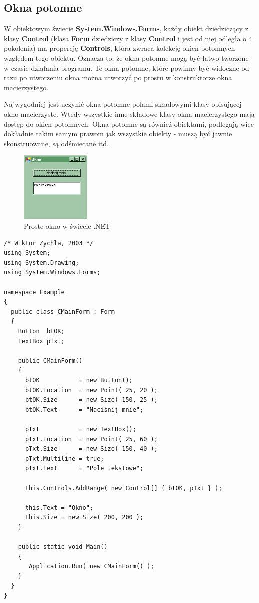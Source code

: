 \subsection{Okna potomne}

W obiektowym świecie {\bf System.Windows.Forms}, każdy obiekt dziedziczący z klasy {\bf Control} (klasa
{\bf Form} dziedziczy z klasy {\bf Control} i jest od niej odległa o 4 pokolenia) ma propercję
{\bf Controls}, która zwraca kolekcję okien potomnych względem tego obiektu. Oznacza to, że
okna potomne mogą być łatwo tworzone w czasie działania programu. Te okna potomne, które powinny
być widoczne od razu po utworzeniu okna można utworzyć po prostu w konstruktorze okna macierzystego.

Najwygodniej jest uczynić okna potomne polami składowymi klasy opisującej okno macierzyste. Wtedy wszystkie
inne składowe klasy okna macierzystego mają dostęp do okien potomnych. Okna potomne są również obiektami,
podlegają więc dokładnie takim samym prawom jak wszystkie obiekty - muszą być jawnie
skonstruowane, są odśmiecane itd.

\begin{figure}
\begin{center}
\includegraphics[width=0.30\textwidth]{./pic/n01}
\caption{Proste okno w świecie .NET}
\end{center}
\end{figure}

\begin{scriptsize}
\begin{verbatim}
/* Wiktor Zychla, 2003 */
using System;
using System.Drawing;
using System.Windows.Forms;

namespace Example
{
  public class CMainForm : Form
  {   
    Button  btOK;
    TextBox pTxt;   

    public CMainForm()
    {
      btOK           = new Button();     
      btOK.Location  = new Point( 25, 20 );
      btOK.Size      = new Size( 150, 25 );
      btOK.Text      = "Naciśnij mnie";

      pTxt           = new TextBox();
      pTxt.Location  = new Point( 25, 60 );
      pTxt.Size      = new Size( 150, 40 );
      pTxt.Multiline = true;
      pTxt.Text      = "Pole tekstowe";

      this.Controls.AddRange( new Control[] { btOK, pTxt } );

      this.Text = "Okno"; 
      this.Size = new Size( 200, 200 );
    }

    public static void Main()
    {
       Application.Run( new CMainForm() );
    }
  }
}
\end{verbatim}
\end{scriptsize}

